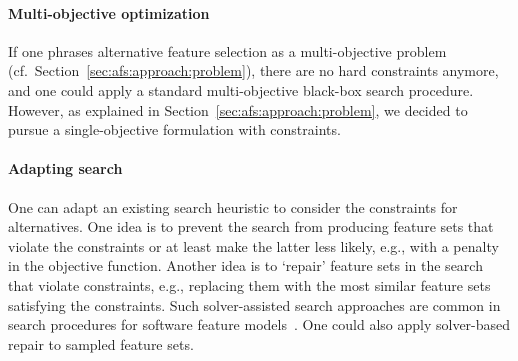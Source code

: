 \documentclass{article}
\theoremstyle{definition}
\begin{document}
\paragraph{Multi-objective optimization}

If one phrases alternative feature selection as a multi-objective problem (cf.~Section~\ref{sec:afs:approach:problem}), there are no hard constraints anymore, and one could apply a standard multi-objective black-box search procedure.
However, as explained in Section~\ref{sec:afs:approach:problem}, we decided to pursue a single-objective formulation with constraints.

\paragraph{Adapting search}

One can adapt an existing search heuristic to consider the constraints for alternatives.
One idea is to prevent the search from producing feature sets that violate the constraints or at least make the latter less likely, e.g., with a penalty in the objective function.
Another idea is to `repair' feature sets in the search that violate constraints, e.g., replacing them with the most similar feature sets satisfying the constraints.
Such solver-assisted search approaches are common in search procedures for software feature models~\cite{guo2018preserve, henard2015combining, white2010automated}.
One could also apply solver-based repair to sampled feature sets.
\end{document}

